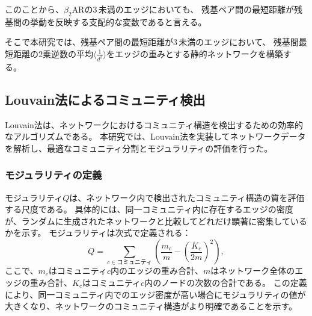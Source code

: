 \begin{table}[!ht]
    \centering
    \caption{タンパク質のノード数と、残基ペア間の最短距離が3\,\text{\AA}未満のエッジ数の中でhydrophobic相互作用を形成する残基ペアが占める割合}
    \label{tab:hydrophobic_rate}
  \end{table}


このことから、$\beta_2$ARの3\,\text{\AA}未満のエッジにおいても、
残基ペア間の最短距離が残基間の挙動を反映する支配的な変数であると言える。

そこで本研究では、残基ペア間の最短距離が3\,\text{\AA}未満のエッジにおいて、
残基間最短距離の2乗逆数の平均$\langle \frac{1}{d^2} \rangle$をエッジの重みとする静的ネットワークを構築する。


\subsection{Louvain法によるコミュニティ検出}

Louvain法は、ネットワークにおけるコミュニティ構造を検出するための効率的なアルゴリズムである。
本研究では、Louvain法\cite{Blondel2008}を実装してネットワークデータを解析し、最適なコミュニティ分割とモジュラリティの評価を行った。
\subsubsection{モジュラリティの定義}
モジュラリティ$Q$は、ネットワーク内で検出されたコミュニティ構造の質を評価する尺度である。
具体的には、同一コミュニティ内に存在するエッジの密度が、ランダムに生成されたネットワークと比較してどれだけ顕著に密集しているかを示す。
モジュラリティは次式で定義される：
\begin{equation}
Q = \sum_{c \in \text{コミュニティ}} \left( \frac{m_c}{m} - \left( \frac{K_c}{2m} \right)^2 \right),
\end{equation}
ここで、$m_c$はコミュニティ$c$内のエッジの重み合計、$m$はネットワーク全体のエッジの重み合計、$K_c$はコミュニティ$c$内のノードの次数の合計である。
この定義により、同一コミュニティ内でのエッジ密度が高い場合にモジュラリティの値が大きくなり、ネットワークのコミュニティ構造がより明確であることを示す。

